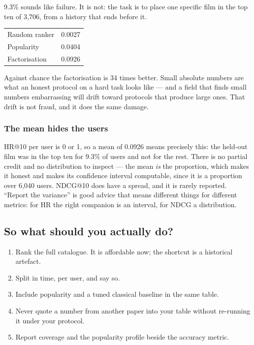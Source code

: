 \documentclass[11pt,a4paper]{article}
\begin{document}
9.3\% sounds like failure. It is not: the task is to place one specific film in
the top ten of 3{,}706, from a history that ends before it.

\begin{center}
\small
\begin{tabular}{lr}
\toprule
Random ranker  & 0.0027 \\
Popularity     & 0.0404 \\
Factorisation  & 0.0926 \\
\bottomrule
\end{tabular}
\end{center}

Against chance the factorisation is 34 times better. Small absolute numbers are
what an honest protocol on a hard task looks like --- and a field that finds
small numbers embarrassing will drift toward protocols that produce large ones.
That drift is not fraud, and it does the same damage.

\subsubsection{The mean hides the users}

HR@10 per user is 0 or 1, so a mean of 0.0926 means precisely this: the
held-out film was in the top ten for 9.3\% of users and not for the rest. There
is no partial credit and no distribution to inspect --- the mean \emph{is} the
proportion, which makes it honest and makes its confidence interval computable,
since it is a proportion over 6{,}040 users. NDCG@10 does have a spread, and it
is rarely reported. ``Report the variance'' is good advice that means different
things for different metrics: for HR the right companion is an interval, for
NDCG a distribution.

\subsection{So what should you actually do?}

\begin{enumerate}[leftmargin=*,nosep]
  \item Rank the full catalogue. It is affordable now; the shortcut is a
        historical artefact.
  \item Split in time, per user, and say so.
  \item Include popularity and a tuned classical baseline in the same table.
  \item Never quote a number from another paper into your table without
        re-running it under your protocol.
  \item Report coverage and the popularity profile beside the accuracy metric.
\end{enumerate}
\end{document}
